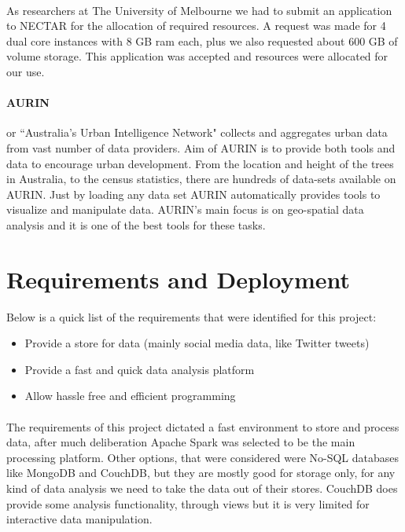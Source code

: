 \documentclass[12pt]{report}
\begin{document}
\paragraph{}
As researchers at The University of Melbourne we had to submit an application to NECTAR for the allocation of required resources. A request was made for 4 dual core instances with 8 GB ram each, plus we also requested about 600 GB of volume storage. This application was accepted and resources were allocated for our use.

\paragraph{AURIN} or ``Australia’s Urban Intelligence Network" collects and aggregates urban data from vast number of data providers. Aim of AURIN is to provide both tools and data to encourage urban development. From the location and height of the trees in Australia, to the census statistics, there are hundreds of data-sets available on AURIN. Just by loading any data set AURIN automatically provides tools to visualize and manipulate data. AURIN's main focus is on geo-spatial data analysis and it is one of the best tools for these tasks.



\section{Requirements and Deployment}
Below is a quick list of the requirements that were identified for this project:
\begin{itemize}
  \item Provide a store for data (mainly social media data, like Twitter tweets) 
  \item Provide a fast and quick data analysis platform
  \item Allow hassle free and efficient programming
\end{itemize}

\paragraph{}
The requirements of this project dictated a fast environment to store and process data, after much deliberation Apache Spark was selected to be the main processing platform. Other options, that were considered were No-SQL databases like MongoDB and CouchDB, but they are mostly good for storage only, for any kind of data analysis we need to take the data out of their stores. CouchDB does provide some analysis functionality, through views but it is very limited for interactive data manipulation.
\end{document}

